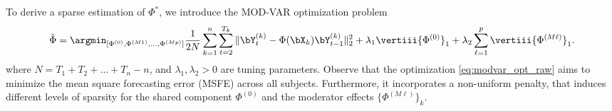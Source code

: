 To derive a sparse estimation of $\Phi^*$, we introduce the MOD-VAR optimization problem
\begin{equation}\label{eq:modvar_opt_raw}
    \hat\Phi = \argmin_{[\Phi^{(0)}, \Phi^{(M1)},\ldots , \Phi^{(Mp)}] } \frac{1}{2N}\sum_{k = 1}^n \sum_{t = 2}^{T_{k}} \| \bY^{(k)}_{t} - \Phi(\bX_k) \bY^{(k)}_{t-1}  \|_2^2 + \lambda_1\vertiii{\Phi^{(0)}}_1 + \lambda_2\sum_{\ell = 1}^p\vertiii{\Phi^{(M\ell)}}_1 .
\end{equation}
where $N = T_1 + T_2 + \ldots + T_n - n$, and $\lambda_1,\lambda_2>0$ are tuning parameters. Observe that the optimization \eqref{eq:modvar_opt_raw} aims to minimize the mean square forecasting error (MSFE) across all subjects. Furthermore, it incorporates a non-uniform penalty, that induces different levels of sparsity for the shared component $\Phi^{(0)}$ and the moderator effects $\{\Phi^{(M\ell)}\}_{k}$.  

